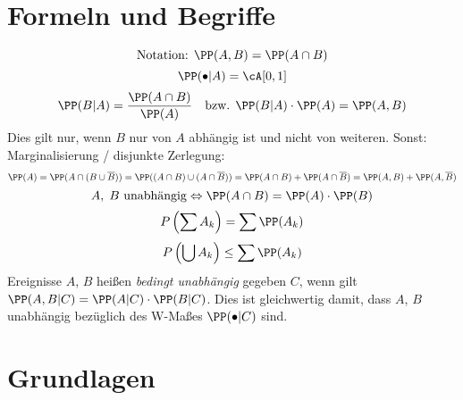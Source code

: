 \section{Formeln und Begriffe}
$$\text{Notation: } \PP(A,B)=\PP(A \cap B)$$
$$\PP(\bullet | A ) = \cA[0,1]$$
$$\PP(B|A)=\frac{\PP(A \cap B)}{\PP(A)} \quad \text{bzw. } \PP(B|A)\cdot \PP(A) = \PP(A,B)$$
Dies gilt nur, wenn $B$ nur von $A$ abhängig ist und nicht von weiteren. Sonst: Marginalisierung / disjunkte Zerlegung:
$$\PP(A) = \PP(A\cap (B \cup \overline{B}))=\PP((A \cap B) \cup (A \cap \overline{B}))=\PP(A \cap B) + \PP(A\cap \overline{B})=\PP(A,B)+\PP(A, \overline{B})$$
$$A, \;B \text{ unabhängig}\Leftrightarrow \PP(A \cap B)=\PP(A) \cdot \PP(B)$$
$$P\left(\sum A_k\right) = \sum \PP(A_k)$$
$$P\left(\bigcup A_k\right) \leq \sum \PP(A_k)$$
Ereignisse $A$, $B$ heißen \emph{bedingt unabhängig} gegeben $C$, wenn gilt $\PP(A,B|C) = \PP(A|C) \cdot \PP(B|C)$. Dies ist gleichwertig damit, dass $A$, $B$ unabhängig bezüglich des W-Maßes $\PP(\bullet|C)$ sind.
\section{Grundlagen}

